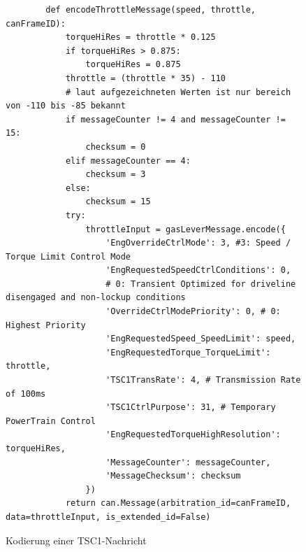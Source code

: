 \begin{figure}[H]
    \begin{verbatim}
        def encodeThrottleMessage(speed, throttle, canFrameID):
            torqueHiRes = throttle * 0.125
            if torqueHiRes > 0.875:
                torqueHiRes = 0.875
            throttle = (throttle * 35) - 110 
            # laut aufgezeichneten Werten ist nur bereich von -110 bis -85 bekannt
            if messageCounter != 4 and messageCounter != 15: 
                checksum = 0
            elif messageCounter == 4:
                checksum = 3
            else:
                checksum = 15
            try:
                throttleInput = gasLeverMessage.encode({ 
                    'EngOverrideCtrlMode': 3, #3: Speed / Torque Limit Control Mode
                    'EngRequestedSpeedCtrlConditions': 0, 
                    # 0: Transient Optimized for driveline disengaged and non-lockup conditions
                    'OverrideCtrlModePriority': 0, # 0: Highest Priority
                    'EngRequestedSpeed_SpeedLimit': speed,
                    'EngRequestedTorque_TorqueLimit': throttle,
                    'TSC1TransRate': 4, # Transmission Rate of 100ms
                    'TSC1CtrlPurpose': 31, # Temporary PowerTrain Control
                    'EngRequestedTorqueHighResolution': torqueHiRes,
                    'MessageCounter': messageCounter,
                    'MessageChecksum': checksum
                })
            return can.Message(arbitration_id=canFrameID, data=throttleInput, is_extended_id=False)
    \end{verbatim}
    \caption{Kodierung einer TSC1-Nachricht}
    \label{fig:encodeThrottleMessage}
\end{figure}



